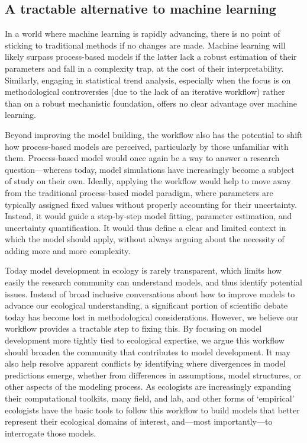 \documentclass[11pt]{article}
\begin{document}
\subsection{A tractable alternative to machine learning}

In a world where machine learning is rapidly advancing, there is no point of sticking to traditional methods if no changes are made. Machine learning will likely surpass process-based models if the latter lack a robust estimation of their parameters and fall in a complexity trap, at the cost of their interpretability. Similarly, engaging in statistical trend analysis, especially when the focus is on methodological controversies (due to the lack of an iterative workflow) rather than on a robust mechanistic foundation, offers no clear advantage over machine learning. %

Beyond improving the model building, the workflow also has the potential to shift how process-based models are perceived, particularly by those unfamiliar with them.
Process-based model would once again be a way to answer a research question---whereas today, model simulations have increasingly become a subject of study on their own.
Ideally, applying the workflow would help to move away from the traditional process-based model paradigm, where parameters are typically assigned fixed values without properly accounting for their uncertainty. Instead, it would guide a step-by-step model fitting, parameter estimation, and uncertainty quantification. It would thus define a clear and limited context in which the model should apply, without always arguing about the necessity of adding more and more complexity. 

Today model development in ecology is rarely transparent, which limits how easily the research community can understand models, and thus identify potential issues. Instead of broad inclusive conversations about how to improve models to advance our ecological understanding, a significant portion of scientific debate today has become lost in methodological considerations. However, we believe our workflow provides a tractable step to fixing this. By focusing on model development more tightly tied to ecological expertise, we argue this workflow should broaden the community that contributes to model development. It may also help resolve apparent conflicts by identifying where divergences in model predictions emerge, whether from differences in assumptions, model structures, or other aspects of the modeling process.
As ecologists are increasingly expanding their computational toolkits, many field, and lab, and other forms of `empirical' ecologists have the basic tools to follow this workflow to build models that better represent their ecological domains of interest, and---most importantly---to interrogate those models.
\end{document}
